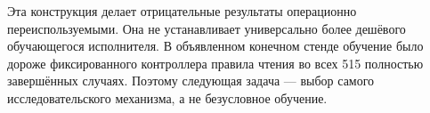 Эта конструкция делает отрицательные результаты операционно переиспользуемыми. Она не устанавливает универсально более дешёвого обучающегося исполнителя. В объявленном конечном стенде обучение было дороже фиксированного контроллера правила чтения во всех 515 полностью завершённых случаях. Поэтому следующая задача --- выбор самого исследовательского механизма, а не безусловное обучение.
